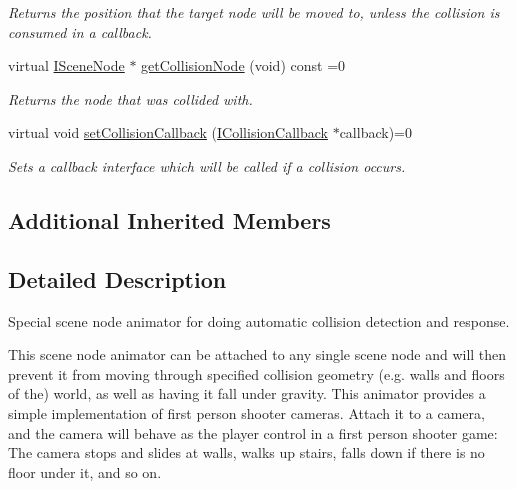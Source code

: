 \begin{DoxyCompactItemize}
\begin{DoxyCompactList}\small\item\em Returns the position that the target node will be moved to, unless the collision is consumed in a callback. \end{DoxyCompactList}\item 
\mbox{\label{classirr_1_1scene_1_1ISceneNodeAnimatorCollisionResponse_a5a975ddf3d776d6bb4c6d44c36cc74fd}} 
virtual \hyperlink{classirr_1_1scene_1_1ISceneNode}{I\+Scene\+Node} $\ast$ \hyperlink{classirr_1_1scene_1_1ISceneNodeAnimatorCollisionResponse_a5a975ddf3d776d6bb4c6d44c36cc74fd}{get\+Collision\+Node} (void) const =0
\begin{DoxyCompactList}\small\item\em Returns the node that was collided with. \end{DoxyCompactList}\item 
virtual void \hyperlink{classirr_1_1scene_1_1ISceneNodeAnimatorCollisionResponse_a2b97f977b446200c5dd22230aec5d275}{set\+Collision\+Callback} (\hyperlink{classirr_1_1scene_1_1ICollisionCallback}{I\+Collision\+Callback} $\ast$callback)=0
\begin{DoxyCompactList}\small\item\em Sets a callback interface which will be called if a collision occurs. \end{DoxyCompactList}\end{DoxyCompactItemize}
\subsection*{Additional Inherited Members}


\subsection{Detailed Description}
Special scene node animator for doing automatic collision detection and response. 

This scene node animator can be attached to any single scene node and will then prevent it from moving through specified collision geometry (e.\+g. walls and floors of the) world, as well as having it fall under gravity. This animator provides a simple implementation of first person shooter cameras. Attach it to a camera, and the camera will behave as the player control in a first person shooter game\+: The camera stops and slides at walls, walks up stairs, falls down if there is no floor under it, and so on.

